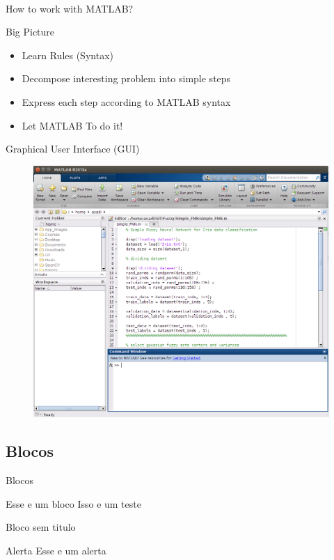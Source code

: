 \documentclass{beamer}
\begin{document}
\begin{frame}{\\How to work with MATLAB?}
	\begin{block}{Big Picture}
		\begin{itemize}
			\item Learn Rules (Syntax)
			\item Decompose interesting problem into simple steps
			\item Express each step according to MATLAB syntax
			\item Let MATLAB To do it!
		\end{itemize}
	\end{block}
\end{frame}


\begin{frame}{Graphical User Interface (GUI)}
	\begin{figure}
		\center
		\includegraphics[scale=0.25]{./Imgs/GUI.png}
	\end{figure}
\end{frame}




\subsection{Blocos}


\begin{frame}{Blocos}
	\begin{block}{Esse e um bloco}
		Isso e um teste
	\end{block}
	\begin{block}{}
	Bloco sem titulo	
	\end{block}
	\begin{alertblock}{Alerta}
		Esse e um alerta
	\end{alertblock}
\end{frame}
\end{document}
